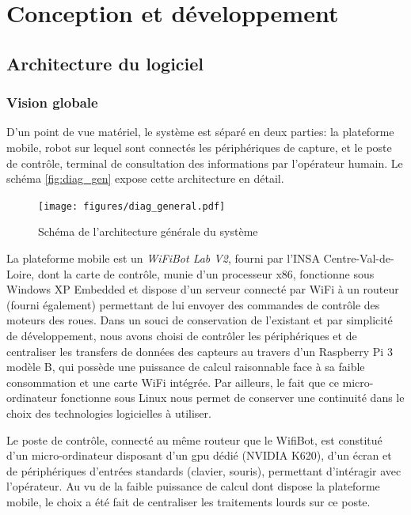 \chapter{Conception et développement}
\label{ch:condev}

	\section{Architecture du logiciel}

		\subsection{Vision globale}
			
			D'un point de vue matériel, le système est séparé en deux parties: la plateforme mobile, robot sur lequel sont connectés les périphériques de capture, et le poste de contrôle, terminal de consultation des informations par l'opérateur humain. Le schéma \autoref{fig:diag_gen} expose cette architecture en détail.
			\begin{figure}[h]
			{
				\centering
				\texttt{[image: figures/diag\_general.pdf]}
				\caption{Schéma de l'architecture générale du système}
				\label{fig:diag_gen}
			}
			\end{figure}
			\par
			La plateforme mobile est un \emph{WiFiBot Lab V2}\cite{wifibot}, fourni par l'INSA Centre-Val-de-Loire, dont la carte de contrôle, munie d'un processeur x86, fonctionne sous Windows XP Embedded et dispose d'un serveur connecté par WiFi à un routeur (fourni également) permettant de lui envoyer des commandes de contrôle des moteurs des roues. Dans un souci de conservation de l'existant et par simplicité de développement, nous avons choisi de contrôler les périphériques et de centraliser les transfers de données des capteurs au travers d'un Raspberry Pi 3 modèle B, qui possède une puissance de calcul raisonnable face à sa faible consommation et une carte WiFi intégrée. Par ailleurs, le fait que ce micro-ordinateur fonctionne sous Linux nous permet de conserver une continuité dans le choix des technologies logicielles à utiliser.
			\par
			Le poste de contrôle, connecté au même routeur que le WifiBot, est constitué d'un micro-ordinateur disposant d'un \gls{gpu} dédié (NVIDIA K620), d'un écran et de périphériques d'entrées standards (clavier, souris), permettant d'intéragir avec l'opérateur. Au vu de la faible puissance de calcul dont dispose la plateforme mobile, le choix a été fait de centraliser les traitements lourds sur ce poste.

